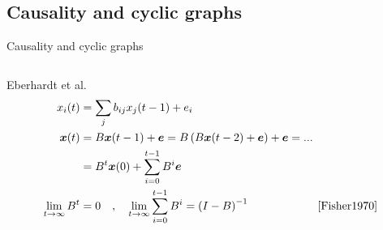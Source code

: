 \subsection{Causality and cyclic graphs}
\begin{frame}{Causality and cyclic graphs}
\label{sec:eberhardt}
\begin{columns}
\begin{column}{0.65\textwidth}
Eberhardt et al.~\cite{CausalLearningReview}
\begin{subequations}
\label{eq:eber_linear}
\begin{align}
x_i (t) &=
    \sum_j b_{ij} x_j (t - 1) + e_i
\\
\label{eq:eber_linear.b}
\boldsymbol{x}(t) &=
    B \boldsymbol{x} (t - 1) + \boldsymbol{e}
=
    B \left( B \boldsymbol{x} (t - 2) + \boldsymbol{e} \right) + \boldsymbol{e} = ...
\\
&=
    B^t \boldsymbol{x}(0) + \sum_{i=0}^{t-1} B^i \boldsymbol{e}
\label{eq:eber_time.b}
\\
\lim_{t \rightarrow \infty} B^t &= 0
\quad,\quad
\lim_{t \rightarrow \infty} \sum_{i=0}^{t-1} B^i = \left( I - B \right)^{-1}
\qquad\qquad\qquad\text{\cite{Fisher1970}}
\label{eq:eber_converge}
\end{align}
\end{subequations}

\end{column}
\end{columns}
\end{frame}
